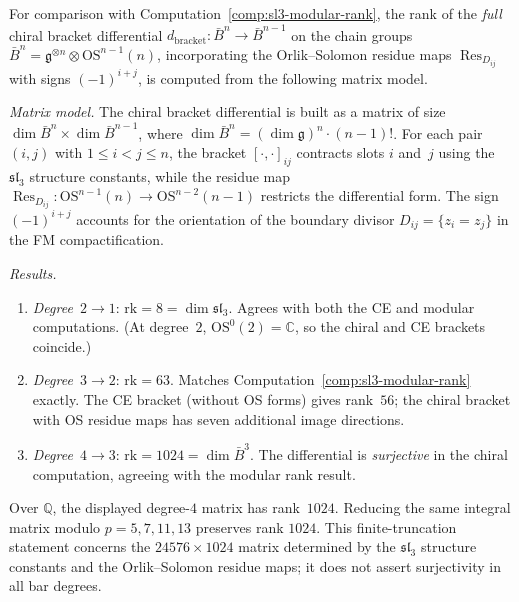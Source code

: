 \begin{computation}
\label{comp:sl3-chiral-bracket-os}

For comparison with Computation~\ref{comp:sl3-modular-rank}, the
rank of the \emph{full} chiral bracket
differential $d_{\mathrm{bracket}}\colon \bar{B}^n \to \bar{B}^{n-1}$
on the chain groups $\bar{B}^n = \mathfrak{g}^{\otimes n} \otimes
\mathrm{OS}^{n-1}(n)$, incorporating the Orlik--Solomon residue maps
$\operatorname{Res}_{D_{ij}}$ with signs $(-1)^{i+j}$, is computed
from the following matrix model.

\emph{Matrix model.}
The chiral bracket differential is built as a matrix of size
$\dim \bar{B}^n \times \dim \bar{B}^{n-1}$, where
$\dim \bar{B}^n = (\dim \mathfrak{g})^n \cdot (n-1)!$.
For each pair $(i,j)$ with $1 \leq i < j \leq n$, the bracket
$[\cdot, \cdot]_{ij}$ contracts slots $i$ and~$j$ using the
$\mathfrak{sl}_3$ structure constants, while the residue map
$\operatorname{Res}_{D_{ij}}\colon \mathrm{OS}^{n-1}(n) \to
\mathrm{OS}^{n-2}(n-1)$ restricts the differential form. The
sign $(-1)^{i+j}$ accounts for the orientation of the boundary
divisor $D_{ij} = \{z_i = z_j\}$ in the FM compactification.

\emph{Results.}
\begin{enumerate}[label=(\roman*)]
\item \emph{Degree~$2 \to 1$}: $\mathrm{rk} = 8 = \dim \mathfrak{sl}_3$.
 Agrees with both the CE and modular computations.
 (At degree~$2$, $\mathrm{OS}^0(2) = \mathbb{C}$, so the chiral
 and CE brackets coincide.)
\item \emph{Degree~$3 \to 2$}: $\mathrm{rk} = 63$.
 Matches Computation~\ref{comp:sl3-modular-rank} exactly.
 The CE bracket (without OS forms) gives rank~$56$; the chiral
 bracket with OS residue maps has seven additional image directions.
\item \emph{Degree~$4 \to 3$}: $\mathrm{rk} = 1024 = \dim \bar{B}^3$.
 The differential is \emph{surjective} in the chiral computation,
 agreeing with the modular rank result.
\end{enumerate}

Over $\mathbb{Q}$, the displayed degree-$4$ matrix has rank~$1024$.
Reducing the same integral matrix modulo $p=5,7,11,13$ preserves rank
$1024$. This finite-truncation statement concerns the
$24576 \times 1024$ matrix determined by the $\mathfrak{sl}_3$ structure
constants and the Orlik--Solomon residue maps; it does not assert
surjectivity in all bar degrees.
\end{computation}


